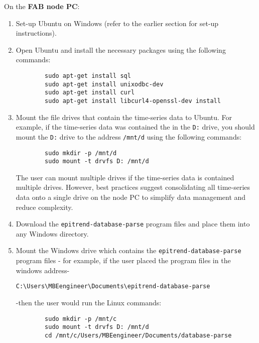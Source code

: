 \documentclass{article}
\begin{document}
\vspace{5pt}
\noindent
On the \textbf{FAB node PC}:
\begin{enumerate}
    \item Set-up Ubuntu on Windows (refer to the earlier section \textbf{} for set-up instructions).
    
    \item Open Ubuntu and install the necessary packages using the following commands:
    \begin{verbatim}
        sudo apt-get install sql
        sudo apt-get install unixodbc-dev
        sudo apt-get install curl
        sudo apt-get install libcurl4-openssl-dev install
    \end{verbatim}
    
    \item Mount the file drives that contain the time-series data to Ubuntu. For example, if the time-series data was contained the in the \texttt{D:} drive, you should mount the \texttt{D:} drive to the address \texttt{/mnt/d} using the following commands:
    \begin{verbatim}
        sudo mkdir -p /mnt/d
        sudo mount -t drvfs D: /mnt/d
    \end{verbatim}
    \noindent
    The user can mount multiple drives if the time-series data is contained multiple drives. However, best practices suggest consolidating all time-series data onto a single drive on the node PC to simplify data management and reduce complexity.
    
    \item Download the \texttt{epitrend-database-parse} program files and place them into any Windows directory.
    
    \item Mount the Windows drive which contains the \texttt{epitrend-database-parse} program files - for example, if the user placed the program files in the windows address-

    \vspace{5pt}
    \noindent
    \texttt{C:\textbackslash{Users}\textbackslash{MBEengineer}\textbackslash{Documents}\textbackslash{epitrend-database-parse}}

    \vspace{5pt}
    \noindent
    -then the user would run the Linux commands:
    \begin{verbatim}
        sudo mkdir -p /mnt/c
        sudo mount -t drvfs D: /mnt/d
        cd /mnt/c/Users/MBEengineer/Documents/database-parse
    \end{verbatim}
    

\end{enumerate}
\end{document}

